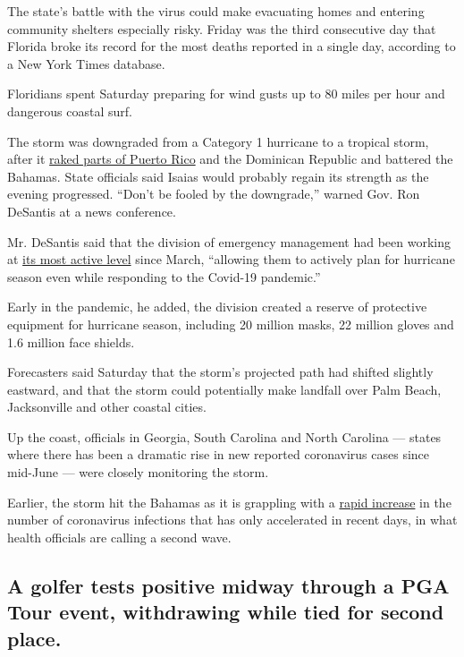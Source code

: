 The state's battle with the virus could make evacuating homes and
entering community shelters especially risky. Friday was the third
consecutive day that Florida broke its record for the most deaths
reported in a single day, according to a New York Times database.

Floridians spent Saturday preparing for wind gusts up to 80 miles per
hour and dangerous coastal surf.

The storm was downgraded from a Category 1 hurricane to a tropical
storm, after it
\href{https://www.nytimes.com/2020/07/31/us/hurricane-isaias.html}{raked
parts of Puerto Rico} and the Dominican Republic and battered the
Bahamas. State officials said Isaias would probably regain its strength
as the evening progressed. ``Don't be fooled by the downgrade,'' warned
Gov. Ron DeSantis at a news conference.

Mr. DeSantis said that the division of emergency management had been
working at
\href{https://www.floridadisaster.org/sert/eoc-activation-levels/}{its
most active level} since March, ``allowing them to actively plan for
hurricane season even while responding to the Covid-19 pandemic.''

Early in the pandemic, he added, the division created a reserve of
protective equipment for hurricane season, including 20 million masks,
22 million gloves and 1.6 million face shields.

Forecasters said Saturday that the storm's projected path had shifted
slightly eastward, and that the storm could potentially make landfall
over Palm Beach, Jacksonville and other coastal cities.

Up the coast, officials in Georgia, South Carolina and North Carolina
--- states where there has been a dramatic rise in new reported
coronavirus cases since mid-June --- were closely monitoring the storm.

Earlier, the storm hit the Bahamas as it is grappling with a
\href{https://www.nytimes.com/2020/07/04/world/americas/virus-caribbean-hurricane.html}{rapid
increase} in the number of coronavirus infections that has only
accelerated in recent days, in what health officials are calling a
second wave.

\hypertarget{a-golfer-tests-positive-midway-through-a-pga-tour-event-withdrawing-while-tied-for-second-place}{%
\subsection{A golfer tests positive midway through a PGA Tour event,
withdrawing while tied for second
place.}\label{a-golfer-tests-positive-midway-through-a-pga-tour-event-withdrawing-while-tied-for-second-place}}


